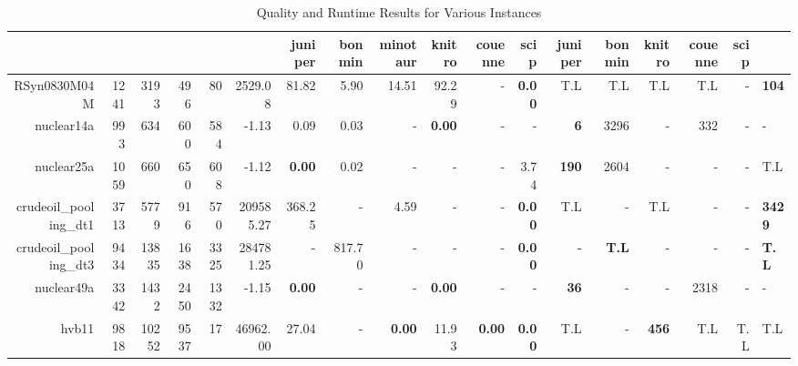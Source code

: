 \begin{table*}[t] 
\footnotesize 
\caption{Quality and Runtime Results for Various Instances} 
\begin{tabular}{|r|r|r|r|r||r||r|r|r|r|r||r|r|r|r|r|r|} 
\hline 
  & juniper    & bonmin  & minotaur & knitro & couenne        & scip            & juniper          & bonmin  & knitro  & couenne         & scip \\  
    \hline 
    \hline 
                      RSyn0830M04M &         1241 &          3193 &          496 &            80 &             2529.08 &          81.82 &           5.90 &         14.51 &          92.29 &             - & \textbf{0.00} &                T.L &                T.L &                T.L &                T.L &            - & \textbf{104} \\ 
                        nuclear14a &          993 &           634 &          600 &           584 &               -1.13 &           0.09 &           0.03 &             - &  \textbf{0.00} &             - &             - &         \textbf{6} &               3296 &                  - &                332 &            - &            - \\ 
                        nuclear25a &         1059 &           660 &          650 &           608 &               -1.12 &  \textbf{0.00} &           0.02 &             - &              - &             - &          3.74 &       \textbf{190} &               2604 &                  - &                  - &            - &          T.L \\ 
            crudeoil\_pooling\_dt1 &         3713 &          5779 &          916 &           570 &           209585.27 &         368.25 &              - &          4.59 &              - &             - & \textbf{0.00} &                T.L &                  - &                T.L &                  - &            - &\textbf{3429} \\ 
            crudeoil\_pooling\_dt3 &         9434 &         13835 &         1638 &          3325 &           284781.25 &              - &         817.70 &             - &              - &             - & \textbf{0.00} &                  - &       \textbf{T.L} &                  - &                  - &            - & \textbf{T.L} \\ 
                        nuclear49a &         3342 &          1432 &         2450 &          1332 &               -1.15 &  \textbf{0.00} &              - &             - &  \textbf{0.00} &             - &             - &        \textbf{36} &                  - &                  - &               2318 &            - &            - \\ 
                             hvb11 &         9818 &         10252 &         9537 &            17 &            46962.00 &          27.04 &              - & \textbf{0.00} &          11.93 & \textbf{0.00} & \textbf{0.00} &                T.L &                  - &       \textbf{456} &                T.L &          T.L &          T.L \\ 
\hline 
\end{tabular}\\ 
\label{table:results} 
\end{table*} 
